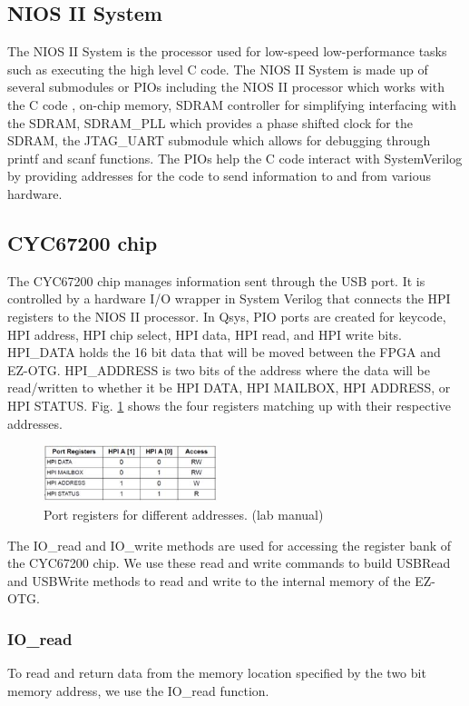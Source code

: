 \documentclass[journal, twocolumn, final,11pt,letterpaper]{IEEEtran}
\begin{document}
\subsection{NIOS II System}
The NIOS II System is the processor used for low-speed low-performance tasks such as executing the high level C code.  The NIOS II System is made up of several submodules or PIOs including the NIOS II processor which works with the C code , on-chip memory, SDRAM controller for simplifying interfacing with the SDRAM, SDRAM\_PLL  which provides a phase shifted clock for the SDRAM, the JTAG\_UART submodule which allows for debugging through printf and scanf functions. The PIOs help the C code interact with SystemVerilog by providing addresses for the code to send information to and from various hardware.  \\ 



\subsection{CYC67200 chip}
The CYC67200 chip manages information sent through the USB port.  It is controlled by a hardware I/O wrapper in System Verilog that connects the HPI registers to the NIOS II processor.  In Qsys, PIO ports are created for keycode, HPI address, HPI chip select, HPI data, HPI read, and HPI write bits.  HPI\_DATA holds the 16 bit data that will be moved between the FPGA and EZ-OTG.  HPI\_ADDRESS is two bits of the address where the data will be read/written to whether it be HPI DATA, HPI MAILBOX, HPI ADDRESS, or HPI STATUS. Fig. \ref{fig:ports} shows the four registers matching up with their respective addresses.   

\begin{figure}[h]
	\centering
	\includegraphics[width=0.45\textwidth]{ports.jpg}
	\caption{Port registers for different addresses. (lab manual)}
	\label{fig:ports}
\end{figure}

The IO\_read and IO\_write methods are used for accessing the register bank of the CYC67200 chip.  We use these read and write commands to build USBRead and USBWrite methods to read and write to the internal memory of the EZ-OTG.

\subsubsection{IO\_read}
To read and return data from the memory location specified by the two bit memory address, we use the IO\_read function. 
\end{document}
